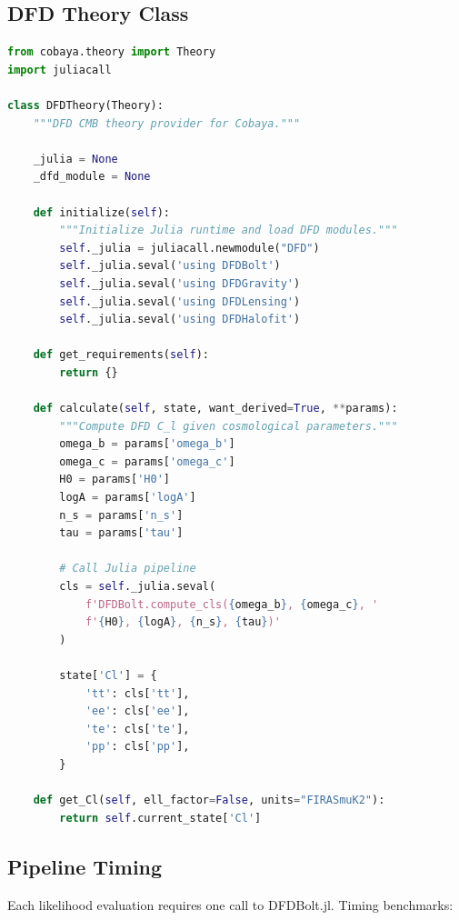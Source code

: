 \documentclass[11pt,a4paper]{article}
\begin{document}
\subsection{DFD Theory Class}

\begin{lstlisting}[language=Python, caption={Cobaya DFD theory class (core structure)}]
from cobaya.theory import Theory
import juliacall

class DFDTheory(Theory):
    """DFD CMB theory provider for Cobaya."""

    _julia = None
    _dfd_module = None

    def initialize(self):
        """Initialize Julia runtime and load DFD modules."""
        self._julia = juliacall.newmodule("DFD")
        self._julia.seval('using DFDBolt')
        self._julia.seval('using DFDGravity')
        self._julia.seval('using DFDLensing')
        self._julia.seval('using DFDHalofit')

    def get_requirements(self):
        return {}

    def calculate(self, state, want_derived=True, **params):
        """Compute DFD C_l given cosmological parameters."""
        omega_b = params['omega_b']
        omega_c = params['omega_c']
        H0 = params['H0']
        logA = params['logA']
        n_s = params['n_s']
        tau = params['tau']

        # Call Julia pipeline
        cls = self._julia.seval(
            f'DFDBolt.compute_cls({omega_b}, {omega_c}, '
            f'{H0}, {logA}, {n_s}, {tau})'
        )

        state['Cl'] = {
            'tt': cls['tt'],
            'ee': cls['ee'],
            'te': cls['te'],
            'pp': cls['pp'],
        }

    def get_Cl(self, ell_factor=False, units="FIRASmuK2"):
        return self.current_state['Cl']
\end{lstlisting}

\subsection{Pipeline Timing}

Each likelihood evaluation requires one call to DFDBolt.jl. Timing benchmarks:
\end{document}
